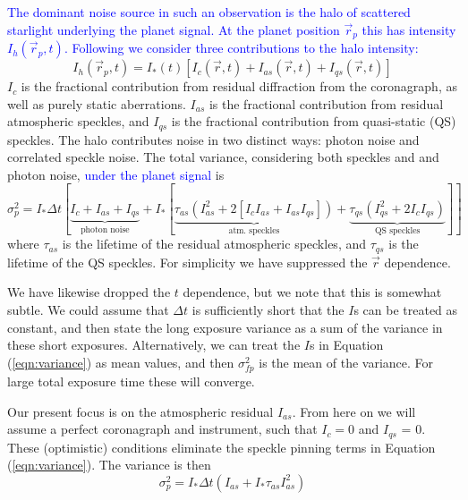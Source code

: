 \documentclass[10pt,preprint]{aastex631}
\newcommand{\jrmadd}[1]{\textcolor{blue}{#1}}
\begin{document}
\jrmadd{The dominant noise source in such an observation is the halo of scattered starlight underlying the planet signal.  At the planet position $\vec{r}_p$ this has intensity $I_h(\vec{r}_p,t)$. Following \citet{2007ApJ...669..642S} we consider three contributions to the halo intensity:}
\begin{equation}
I_h(\vec{r}_p,t) = I_{*}(t)\left[I_c(\vec{r},t) + I_{as}(\vec{r},t) + I_{qs}(\vec{r},t)\right]
\end{equation}
$I_c$ is the fractional contribution from residual diffraction from the coronagraph, as well as purely static aberrations.  $I_{as}$ is the fractional contribution from residual atmospheric speckles, and $I_{qs}$ is the fractional contribution from quasi-static (QS) speckles.  The halo contributes noise in two distinct ways: photon noise and correlated speckle noise.
The total variance, considering both speckles and and photon noise, \jrmadd{under the planet signal} is \citep{2007ApJ...669..642S} 
\begin{equation}
\sigma^2_{p}  = I_* \Delta t [\underbrace{I_c + I_{as} + I_{qs}}_{\mbox{photon noise}} + I_* [ \underbrace{\tau_{as}\left(I_{as}^2 + 2[I_cI_{as} + I_{as}I_{qs}]  \right)}_{\mbox{atm. speckles}} +  \underbrace{\tau_{qs}\left( I_{qs}^2 + 2 I_c I_{qs}\right)}_{\mbox{QS speckles}}]]
\label{eqn:variance}
\end{equation}
where $\tau_{as}$ is the lifetime of the residual atmospheric speckles, and $\tau_{qs}$ is the lifetime of the QS speckles.  For simplicity we have suppressed the $\vec{r}$ dependence.   

We have likewise dropped the $t$ dependence, but we note that this is somewhat subtle.  We could assume that $\Delta t$ is sufficiently short that the $I$s can be treated as constant, and then state the long exposure variance as a sum of the variance in these short exposures.  Alternatively, we can treat the $I$s in Equation (\ref{eqn:variance}) as mean values, and then $\sigma^2_{fp}$ is the mean of the variance.  For large total exposure time these will converge.

Our present focus is on the atmospheric residual $I_{as}$.  From here on we will assume a perfect coronagraph and instrument, such that $I_c = 0$ and $I_{qs}$ = 0.  These (optimistic) conditions eliminate the speckle pinning \citep{2001ApJ...558L..71B} terms in Equation (\ref{eqn:variance}).  The variance is then
\begin{equation}
\sigma^2_{p}  = I_* \Delta t \left(I_{as} + I_* \tau_{as} I_{as}^2 \right)
\label{eqn:variance_as}
\end{equation}
\end{document}
